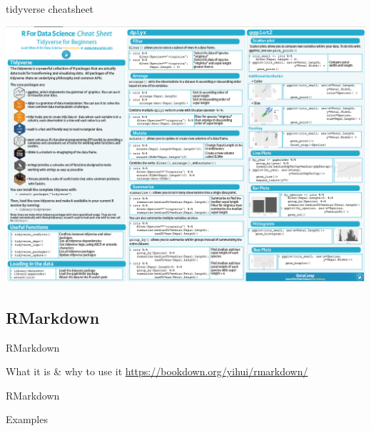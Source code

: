 \documentclass[
  ignorenonframetext,
]{beamer}
\begin{document}
\begin{frame}{tidyverse cheatsheet}
\protect\hypertarget{tidyverse-cheatsheet}{}

\includegraphics{../external/images/r_cheatsheet_tidy.PNG}

\end{frame}

\hypertarget{rmarkdown}{%
\subsection{RMarkdown}\label{rmarkdown}}

\begin{frame}{RMarkdown}
\protect\hypertarget{rmarkdown-1}{}

What it is \& why to use it \url{https://bookdown.org/yihui/rmarkdown/}

\end{frame}

\begin{frame}{RMarkdown}
\protect\hypertarget{rmarkdown-2}{}

Examples

\end{frame}
\end{document}
